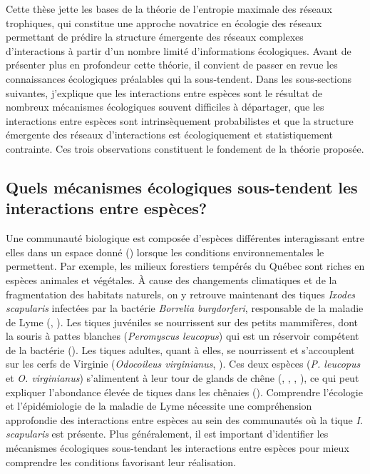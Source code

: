 Cette thèse jette les bases de la théorie de l'entropie maximale des réseaux
trophiques, qui constitue une approche novatrice en écologie des réseaux
permettant de prédire la structure émergente des réseaux complexes
d'interactions à partir d'un nombre limité d'informations écologiques. Avant de
présenter plus en profondeur cette théorie, il convient de passer en revue les
connaissances écologiques préalables qui la sous-tendent. Dans les sous-sections
suivantes, j'explique que les interactions entre espèces sont le résultat de
nombreux mécanismes écologiques souvent difficiles à départager, que les
interactions entre espèces sont intrinsèquement probabilistes et que la
structure émergente des réseaux d'interactions est écologiquement et
statistiquement contrainte. Ces trois observations constituent le fondement de
la théorie proposée.

\subsection{Quels mécanismes écologiques sous-tendent les interactions entre espèces?} 

Une communauté biologique est composée d'espèces différentes interagissant entre
elles dans un espace donné (\cite{Stroud2015Community}) lorsque les conditions
environnementales le permettent. Par exemple, les milieux forestiers tempérés du
Québec sont riches en espèces animales et végétales. À cause des changements
climatiques et de la fragmentation des habitats naturels, on y retrouve
maintenant des tiques \textit{Ixodes scapularis} infectées par la bactérie
\textit{Borrelia burgdorferi}, responsable de la maladie de Lyme
(\cite{Ogden2009Emergence}, \cite{Simon2014Climate}). Les tiques juvéniles se
nourrissent sur des petits mammifères, dont la souris à pattes blanches
(\textit{Peromyscus leucopus}) qui est un réservoir compétent de la bactérie
(\cite{Donahue1987Reservoir}). Les tiques adultes, quant à elles, se nourrissent
et s'accouplent sur les cerfs de Virginie (\textit{Odocoileus virginianus},
\cite{Lane1991Lyme}). Ces deux espèces (\textit{P. leucopus} et \textit{O.
virginianus}) s'alimentent à leur tour de glands de chêne
(\cite{McShea1993Variablea}, \cite{Elkinton1996Interactions},
\cite{Wolff1996Population}, \cite{McShea2000Influence}), ce qui peut expliquer
l'abondance élevée de tiques dans les chênaies (\cite{Ostfeld2006Climate}).
Comprendre l'écologie et l'épidémiologie de la maladie de Lyme nécessite une
compréhension approfondie des interactions entre espèces au sein des communautés
où la tique \textit{I. scapularis} est présente. Plus généralement, il est
important d'identifier les mécanismes écologiques sous-tendant les interactions
entre espèces pour mieux comprendre les conditions favorisant leur réalisation. 

